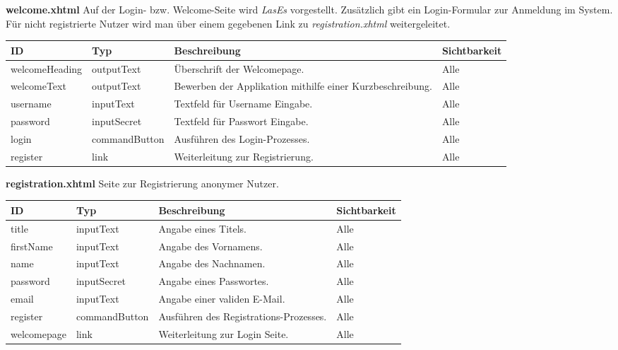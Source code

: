 \textbf{welcome.xhtml} Auf der Login- bzw. Welcome-Seite wird \emph{LasEs} vorgestellt.
Zusätzlich gibt ein Login-Formular zur Anmeldung im System.
Für nicht registrierte Nutzer wird man über einem gegebenen Link zu \emph{registration.xhtml} weitergeleitet.


\begin{tabular}[H]{|m{2cm}|m{3cm}|m{6cm}|m{2.5cm}|}
    \hline
    \textbf{ID} & \textbf{Typ} & \textbf{Beschreibung} & \textbf{Sichtbarkeit} \\
    \hline
    \hline
    welcomeHeading & outputText & Überschrift der Welcomepage. & Alle\\
    \hline
    welcomeText & outputText & Bewerben der Applikation mithilfe einer Kurzbeschreibung. & Alle \\
    \hline
    username & inputText & Textfeld für Username Eingabe. & Alle \\
    \hline
    password & inputSecret & Textfeld für Passwort Eingabe. & Alle \\
    \hline
    login & commandButton & Ausführen des Login-Prozesses. & Alle \\
    \hline
    register & link & Weiterleitung zur Registrierung. & Alle \\
    \hline
\end{tabular}

\textbf{registration.xhtml} Seite zur Registrierung anonymer Nutzer.

\begin{tabular}[H]{|m{2cm}|m{3cm}|m{6cm}|m{2.5cm}|}
    \hline
    \textbf{ID} & \textbf{Typ} & \textbf{Beschreibung} & \textbf{Sichtbarkeit} \\
    \hline
    \hline
    title & inputText & Angabe eines Titels. & Alle \\
    \hline
    firstName & inputText & Angabe des Vornamens. & Alle \\
    \hline
    name & inputText & Angabe des Nachnamen. & Alle \\
    \hline
    password & inputSecret & Angabe eines Passwortes. & Alle \\
    \hline
    email & inputText & Angabe einer validen E-Mail. & Alle \\
    \hline
    register & commandButton & Ausführen des Registrations-Prozesses. & Alle \\
    \hline
    welcomepage & link & Weiterleitung zur Login Seite. & Alle\\
    \hline
\end{tabular}

